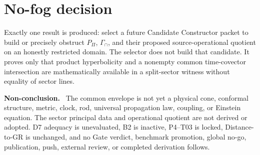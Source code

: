 \documentclass[11pt]{article}
\newenvironment{nonconclusion}{\par\smallskip\noindent\textbf{Non-conclusion.}\ }{\par\smallskip}
\newcommand{\GammaInt}{\Gamma_{\cap}}
\newcommand{\Pprod}{P_{\Pi}}
\begin{document}
\section{No-fog decision}

Exactly one result is produced: select a future Candidate Constructor packet
to build or precisely obstruct \(\Pprod\), \(\GammaInt\), and their proposed
source-operational quotient on an honestly restricted domain.  The selector
does not build that candidate.  It proves only that product hyperbolicity and
a nonempty common time-covector intersection are mathematically available in
a split-sector witness without equality of sector lines.

\begin{nonconclusion}
The common envelope is not yet a physical cone, conformal structure, metric,
clock, rod, universal propagation law, coupling, or Einstein equation.  The
sector principal data and operational quotient are not derived or adopted.
D7 adequacy is unevaluated, B2 is inactive, P4--T03 is locked, Distance-to-GR
is unchanged, and no Gate verdict, benchmark promotion, global no-go,
publication, push, external review, or completed derivation follows.
\end{nonconclusion}
\end{document}
